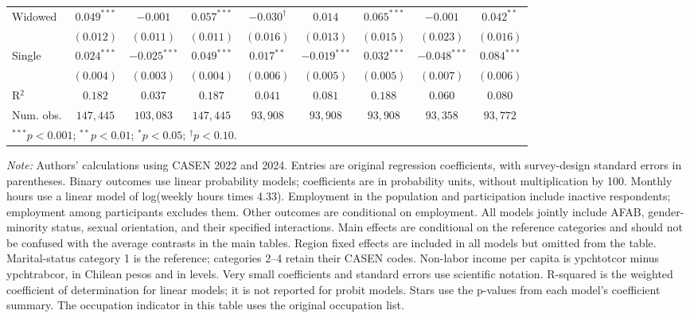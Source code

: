 \begin{table}[htpb]
{\begin{tabular}{l c c c c c c c c}
Widowed & $0.049^{***}$ & $-0.001$ & $0.057^{***}$ & $-0.030^{\dagger}$ & $0.014$ & $0.065^{***}$ & $-0.001$ & $0.042^{**}$ \\
 & $(0.012)$ & $(0.011)$ & $(0.011)$ & $(0.016)$ & $(0.013)$ & $(0.015)$ & $(0.023)$ & $(0.016)$ \\
Single & $0.024^{***}$ & $-0.025^{***}$ & $0.049^{***}$ & $0.017^{**}$ & $-0.019^{***}$ & $0.032^{***}$ & $-0.048^{***}$ & $0.084^{***}$ \\
 & $(0.004)$ & $(0.003)$ & $(0.004)$ & $(0.006)$ & $(0.005)$ & $(0.005)$ & $(0.007)$ & $(0.006)$ \\
\hline
R$^2$ & $0.182$ & $0.037$ & $0.187$ & $0.041$ & $0.081$ & $0.188$ & $0.060$ & $0.080$ \\
Num. obs. & $147,445$ & $103,083$ & $147,445$ & $93,908$ & $93,908$ & $93,908$ & $93,358$ & $93,772$ \\
\hline
\multicolumn{9}{l}{\scriptsize $^{***}p<0.001$; $^{**}p<0.01$; $^{*}p<0.05$; $^{\dagger}p<0.10$.} \\
\end{tabular}%
}
\par\smallskip
\begin{minipage}{\textwidth}\footnotesize\raggedright
\textit{Note:} Authors' calculations using CASEN 2022 and 2024. Entries are original regression coefficients, with survey-design standard errors in parentheses. Binary outcomes use linear probability models; coefficients are in probability units, without multiplication by 100. Monthly hours use a linear model of log(weekly hours times 4.33). Employment in the population and participation include inactive respondents; employment among participants excludes them. Other outcomes are conditional on employment. All models jointly include AFAB, gender-minority status, sexual orientation, and their specified interactions. Main effects are conditional on the reference categories and should not be confused with the average contrasts in the main tables. Region fixed effects are included in all models but omitted from the table. Marital-status category 1 is the reference; categories 2--4 retain their CASEN codes. Non-labor income per capita is ypchtotcor minus ypchtrabcor, in Chilean pesos and in levels. Very small coefficients and standard errors use scientific notation. R-squared is the weighted coefficient of determination for linear models; it is not reported for probit models. Stars use the p-values from each model's coefficient summary. The occupation indicator in this table uses the original occupation list.
\end{minipage}
\end{table}
